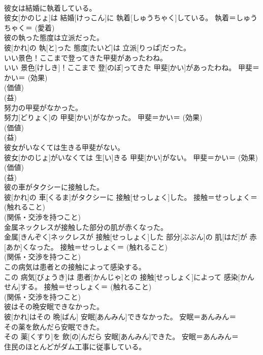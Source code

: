 \documentclass[8pt]{extreport}
\begin{document}
\begin{CJK}{UTF8}{min}
{\\	彼女は結婚に執着している。	
\\	彼女[かのじょ]は 結婚[けっこん]に 執着[しゅうちゃく]している。	執着＝しゅうちゃく＝ (愛着) 
\\	彼の執った態度は立派だった。	
\\	彼[かれ]の 執[と]った 態度[たいど]は 立派[りっぱ]だった。	
\\	いい景色！ここまで登ってきた甲斐があったわね。	
\\	いい 景色[けしき]！ここまで 登[のぼ]ってきた 甲斐[かい]があったわね。	甲斐＝かい＝ (効果) 
\\	(価値) 
\\	(益) 
\\	努力の甲斐がなかった。	
\\	努力[どりょく]の 甲斐[かい]がなかった。	甲斐＝かい＝ (効果) 
\\	(価値) 
\\	(益) 
\\	彼女がいなくては生きる甲斐がない。	
\\	彼女[かのじょ]がいなくては 生[い]きる 甲斐[かい]がない。	甲斐＝かい＝ (効果) 
\\	(価値) 
\\	(益) 
\\	彼の車がタクシーに接触した。	
\\	彼[かれ]の 車[くるま]がタクシーに 接触[せっしょく]した。	接触＝せっしょく＝ (触れること) 
\\	(関係・交渉を持つこと)
\\	金属ネックレスが接触した部分の肌が赤くなった。	
\\	金属[きんぞく]ネックレスが 接触[せっしょく]した 部分[ぶぶん]の 肌[はだ]が 赤[あか]くなった。	接触＝せっしょく＝ (触れること) 
\\	(関係・交渉を持つこと)
\\	この病気は患者との接触によって感染する。	
\\	この 病気[びょうき]は 患者[かんじゃ]との 接触[せっしょく]によって 感染[かんせん]する。	接触＝せっしょく＝ (触れること) 
\\	(関係・交渉を持つこと)
\\	彼はその晩安眠できなかった。	
\\	彼[かれ]はその 晩[ばん] 安眠[あんみん]できなかった。	安眠＝あんみん＝ 
\\	その薬を飲んだら安眠できた。	
\\	その 薬[くすり]を 飲[の]んだら 安眠[あんみん]できた。	安眠＝あんみん＝ 
\\	住民のほとんどがダム工事に従事している。	
}
\end{CJK}
\end{document}
